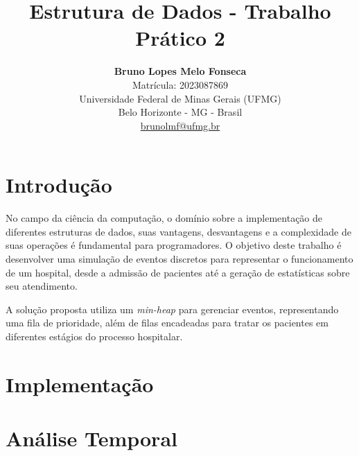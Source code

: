 \newcommand{\RR}{\mathbb{R}}
\newcommand{\QQ}{\mathbb{Q}}
\newcommand{\CC}{\mathbb{C}}

\geometry{margin=2.5cm}

\title{\textbf{Estrutura de Dados - Trabalho Prático 2 }}
\author{
    \textbf{Bruno Lopes Melo Fonseca} \\
    Matrícula: 2023087869 \\
    \bigskip
    Universidade Federal de Minas Gerais (UFMG) \\
    Belo Horizonte - MG - Brasil \\
    \href{mailto:email@ufmg.br}{brunolmf@ufmg.br}
}
\date{}




\maketitle


\section{Introdução}

No campo da ciência da computação, o domínio sobre a implementação de diferentes estruturas de dados, suas vantagens, desvantagens e a complexidade de suas operações é fundamental para programadores. O objetivo deste trabalho é desenvolver uma simulação de eventos discretos para representar o funcionamento de um hospital, desde a admissão de pacientes até a geração de estatísticas sobre seu atendimento.

A solução proposta utiliza um \textit{min-heap} para gerenciar eventos, representando uma fila de prioridade, além de filas encadeadas para tratar os pacientes em diferentes estágios do processo hospitalar.

\section{Implementação}



\section{Análise Temporal}


